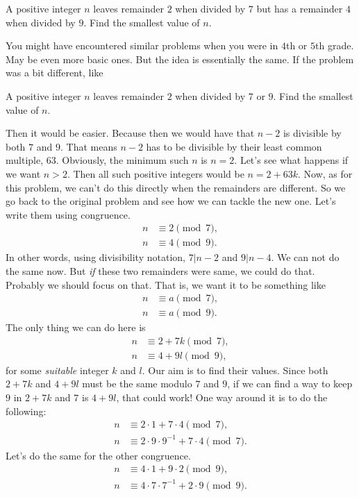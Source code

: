 \documentclass{subfile}
\begin{document}
	\begin{problem}
		A positive integer $n$ leaves remainder $2$ when divided by $7$ but has a remainder $4$ when divided by $9$. Find the smallest value of $n$.
	\end{problem}
	You might have encountered similar problems when you were in $4$th or $5$th grade. May be even more basic ones. But the idea is essentially the same. If the problem was a bit different, like
	\begin{problem}
		A positive integer $n$ leaves remainder $2$ when divided by $7$ or $9$. Find the smallest value of $n$.
	\end{problem}
	Then it would be easier. Because then we would have that $n-2$ is 
	divisible by both $7$ and $9$. That means $n-2$ has to be divisible by their least common multiple, $63$. Obviously, the minimum such $n$ is $n=2$. Let's see what happens if we want $n>2$. Then all such positive integers would be $n=2+63k$. Now, as for this problem, we can't do this directly when the remainders are different. So we go back to the original problem and see how we can tackle the new one. Let's write them using congruence.
	\begin{align*}
	n & \equiv2\pmod{7},\\
	n & \equiv4\pmod{9}.
	\end{align*}
	In other words, using divisibility notation, $7|n-2$ and $9|n-4$. We can not do the same now. But \textit{if} these two remainders were same, we could do that. Probably we should focus on that. That is, we want it to be something like
		\begin{align*}
			n & \equiv a\pmod 7,\\
			n & \equiv a\pmod 9.
		\end{align*}
	The only thing we can do here is
		\begin{align*}
			n & \equiv2+7k\pmod7,\\
			n & \equiv4+9l\pmod9,
		\end{align*}
	for some \textit{suitable} integer $k$ and $l$. Our aim is to find their values. Since both $2+7k$ and $4+9l$ must be the same modulo $7$ and $9$, if we can find a way to keep $9$ in $2+7k$ and $7$ is $4+9l$, that could work! One way around it is to do the following:
		\begin{align*}
			n & \equiv2\cdot1+7\cdot4\pmod7,\\
			n & \equiv2\cdot9\cdot9^{-1}+7\cdot4\pmod{7}.
		\end{align*}
	Let's do the same for the other congruence.
		\begin{align*}
			n & \equiv4\cdot1+9\cdot2\pmod{9},\\
			n & \equiv4\cdot7\cdot7^{-1}+2\cdot9\pmod{9}.
		\end{align*}
\end{document}
